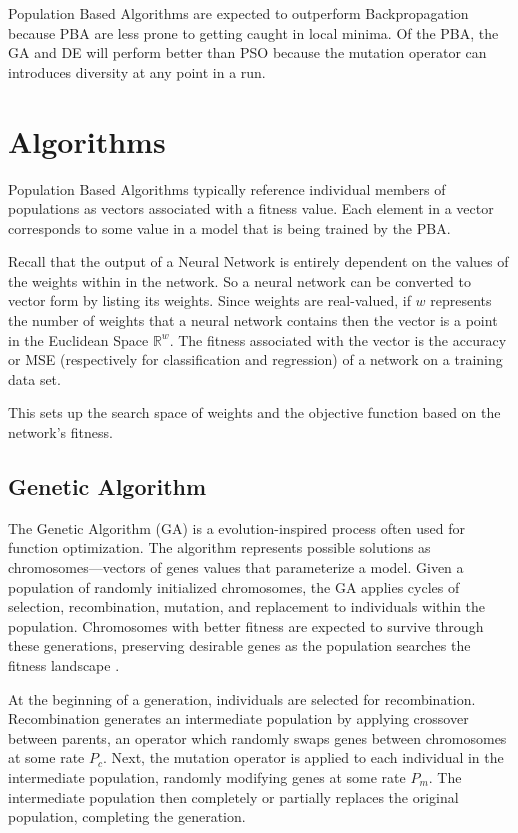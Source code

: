 \documentclass[twoside,11pt]{article}
\begin{document}
	Population Based Algorithms are expected to outperform Backpropagation because PBA are less prone to getting caught in local minima. 
	Of the PBA, the GA and DE will perform better than PSO because the mutation operator can introduces diversity at any point in a run. 
	
\section{Algorithms}

	Population Based Algorithms typically reference individual members of populations as vectors associated with a fitness value. Each element in a vector corresponds to some value in a model that is being trained by the PBA.
	
	Recall that the output of a Neural Network is entirely dependent on the values of the weights within in the network. 
	So a neural network can be converted to vector form by listing its weights.
	Since weights are real-valued, if $w$ represents the number of weights that a neural network contains then the vector is a point in the Euclidean Space $\mathbb{R}^w$. 
	The fitness associated with the vector is the accuracy or MSE (respectively for classification and regression) of a network on a training data set. 
	
	This sets up the search space of weights and the objective function based on the network's fitness.

\subsection{Genetic Algorithm}

	The Genetic Algorithm (GA) is a evolution-inspired process often used for function optimization. The algorithm represents possible solutions as chromosomes---vectors of genes values that parameterize a model. Given a population of randomly initialized chromosomes, the GA applies cycles of selection, recombination, mutation, and replacement to individuals within the population. Chromosomes with better fitness are expected to survive through these generations, preserving desirable genes as the population searches the fitness landscape \citep{ga_tutorial}.

	At the beginning of a generation, individuals are selected for recombination. Recombination generates an intermediate population by applying crossover between parents, an operator which randomly swaps genes between chromosomes at some rate $P_c$. Next, the mutation operator is applied to each individual in the intermediate population, randomly modifying genes at some rate $P_m$. The intermediate population then completely or partially replaces the original population, completing the generation.
	
\end{document}
